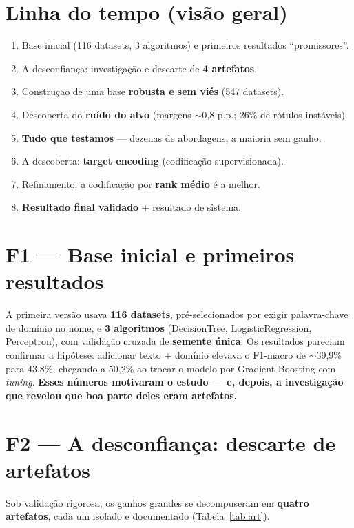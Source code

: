 \documentclass[11pt]{article}
\begin{document}
\section{Linha do tempo (visão geral)}
\begin{enumerate}[leftmargin=2.2em]
  \item[\textbf{F1.}] Base inicial (116 datasets, 3 algoritmos) e primeiros resultados ``promissores''.
  \item[\textbf{F2.}] A desconfiança: investigação e descarte de \textbf{4 artefatos}.
  \item[\textbf{F3.}] Construção de uma base \textbf{robusta e sem viés} (547 datasets).
  \item[\textbf{F4.}] Descoberta do \textbf{ruído do alvo} (margens $\sim$0,8 p.p.; 26\% de rótulos instáveis).
  \item[\textbf{F5.}] \textbf{Tudo que testamos} --- dezenas de abordagens, a maioria sem ganho.
  \item[\textbf{F6.}] A descoberta: \textbf{target encoding} (codificação supervisionada).
  \item[\textbf{F7.}] Refinamento: a codificação por \textbf{rank médio} é a melhor.
  \item[\textbf{F8.}] \textbf{Resultado final validado} + resultado de sistema.
\end{enumerate}

\section{F1 --- Base inicial e primeiros resultados}
A primeira versão usava \textbf{116 datasets}, pré-selecionados por exigir
palavra-chave de domínio no nome, e \textbf{3 algoritmos} (DecisionTree,
LogisticRegression, Perceptron), com validação cruzada de \textbf{semente única}.
Os resultados pareciam confirmar a hipótese: adicionar texto + domínio elevava o
F1-macro de $\sim$39,9\% para 43,8\%, chegando a 50,2\% ao trocar o modelo por
Gradient Boosting com \emph{tuning}. \textbf{Esses números motivaram o estudo ---
e, depois, a investigação que revelou que boa parte deles eram artefatos.}

\section{F2 --- A desconfiança: descarte de artefatos}
Sob validação rigorosa, os ganhos grandes se decompuseram em \textbf{quatro
artefatos}, cada um isolado e documentado (Tabela~\ref{tab:art}).
\end{document}
